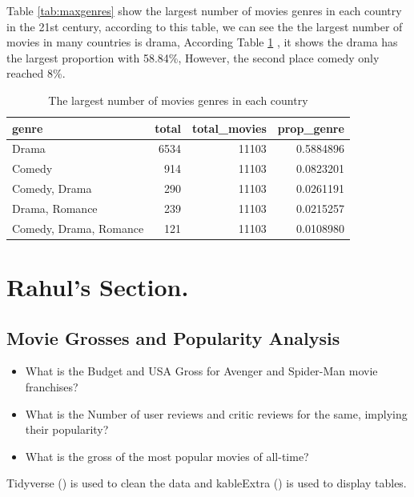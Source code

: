 \documentclass[11pt,a4paper,]{article}
\begin{document}
Table \ref{tab:maxgenres} show the largest number of movies genres in each country in the 21st century, according to this table, we can see the the largest number of movies in many countries is drama, According Table \ref{tab:pretdrame} , it shows the drama has the largest proportion with 58.84\%, However, the second place comedy only reached 8\%.

\begin{table}

\caption{\label{tab:pretdrame} The largest number of movies genres in each country}
\centering
\begin{tabular}[t]{lrrr}
\toprule
genre & total & total\_movies & prop\_genre\\
\midrule
Drama & 6534 & 11103 & 0.5884896\\
Comedy & 914 & 11103 & 0.0823201\\
Comedy, Drama & 290 & 11103 & 0.0261191\\
Drama, Romance & 239 & 11103 & 0.0215257\\
Comedy, Drama, Romance & 121 & 11103 & 0.0108980\\
\bottomrule
\end{tabular}
\end{table}

\newpage

\hypertarget{rahuls-section.}{%
\section{Rahul's Section.}\label{rahuls-section.}}

\hypertarget{movie-grosses-and-popularity-analysis}{%
\subsection{Movie Grosses and Popularity Analysis}\label{movie-grosses-and-popularity-analysis}}

\begin{itemize}
\item
  What is the Budget and USA Gross for Avenger and Spider-Man movie franchises?
\item
  What is the Number of user reviews and critic reviews for the same, implying their popularity?
\item
  What is the gross of the most popular movies of all-time?
\end{itemize}

Tidyverse (\textcite{tidyverse}) is used to clean the data and kableExtra (\textcite{kableExtra}) is used to display tables.
\end{document}
